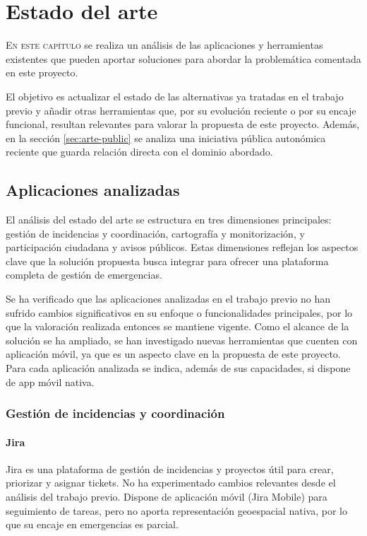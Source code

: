 \chapter{Estado del arte}
\label{chap:estadoarte}

\lettrine{E}{n este capítulo} se realiza un análisis de las aplicaciones y herramientas existentes que pueden aportar soluciones para abordar la problemática comentada en este proyecto.

El objetivo es actualizar el estado de las alternativas ya tratadas en el trabajo previo \cite{TFGAdrianGarcia2025} y añadir otras herramientas que, por su evolución reciente o por su encaje funcional, resultan relevantes para valorar la propuesta de este proyecto. Además, en la sección \ref{sec:arte-public} se analiza una iniciativa pública autonómica reciente que guarda relación directa con el dominio abordado.

\section{Aplicaciones analizadas}
\label{sec:arte-tfg}
El análisis del estado del arte se estructura en tres dimensiones principales: gestión de incidencias y coordinación, cartografía y monitorización, y participación ciudadana y avisos públicos. Estas dimensiones reflejan los aspectos clave que la solución propuesta busca integrar para ofrecer una plataforma completa de gestión de emergencias.

Se ha verificado que las aplicaciones analizadas en el trabajo previo \cite{TFGAdrianGarcia2025} no han sufrido cambios significativos en su enfoque o funcionalidades principales, por lo que la valoración realizada entonces se mantiene vigente. Como el alcance de la solución se ha ampliado, se han investigado nuevas herramientas que cuenten con aplicación móvil, ya que es un aspecto clave en la propuesta de este proyecto. Para cada aplicación analizada se indica, además de sus capacidades, si dispone de app móvil nativa.

\subsection{Gestión de incidencias y coordinación}

\subsubsection{Jira}
Jira \cite{jira} es una plataforma de gestión de incidencias y proyectos útil para crear, priorizar y asignar tickets. No ha experimentado cambios relevantes desde el análisis del trabajo previo. Dispone de aplicación móvil (Jira Mobile) para seguimiento de tareas, pero no aporta representación geoespacial nativa, por lo que su encaje en emergencias es parcial.

